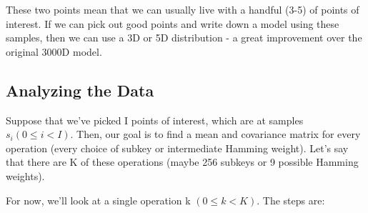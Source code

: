     These two points mean that we can usually live with a handful (3-5) of points of interest. If we can pick out good points and write down a model using these samples, then we can use a 3D or 5D distribution - a great improvement over the original 3000D model.
   \subsection{Analyzing the Data}
    Suppose that we've picked I points of interest, which are at samples $s_i (0 \le i < I)$. Then, our goal is to find a mean and covariance matrix for every operation (every choice of subkey or intermediate Hamming weight). Let's say that there are K of these operations (maybe 256 subkeys or 9 possible Hamming weights).
    
    For now, we'll look at a single operation k $(0 \le k < K)$. The steps are:
